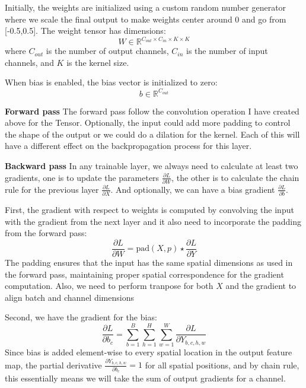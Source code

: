 \documentclass[conference]{IEEEtran}
\begin{document}
Initially, the weights are initialized using a custom random number generator where we scale the final output to make weights center around 0 and go from [-0.5,0.5]. The weight tensor has dimensions:
\begin{equation}
W \in \mathbb{R}^{C_{out} \times C_{in} \times K \times K}
\end{equation}
where $C_{out}$ is the number of output channels, $C_{in}$ is the number of input channels, and $K$ is the kernel size.

When bias is enabled, the bias vector is initialized to zero:
\begin{equation}
b \in \mathbb{R}^{C_{out}}
\end{equation}

\textbf{Forward pass} The forward pass follow the convolution operation I have created above for the Tensor. Optionally, the input could add more padding to control the shape of the output or we could do a dilation for the kernel. Each of this will have a different effect on the backpropagation process for this layer.

\textbf{Backward pass} In any trainable layer, we always need to calculate at least two gradients, one is to update the parameters $\frac{\partial L}{\partial W}$, the other is to calculate the chain rule for the previous layer $\frac{\partial L}{\partial X}$. And optionally, we can have a bias gradient $\frac{\partial L}{\partial b}$.

First, the gradient with respect to weights is computed by convolving the input with the gradient from the next layer and it also need to incorporate the padding from the forward pass:
\begin{equation}
\frac{\partial L}{\partial W} = \text{pad}(X, p) \star \frac{\partial L}{\partial Y}
\end{equation}
The padding ensures that the input has the same spatial dimensions as used in the forward pass, maintaining proper spatial correspondence for the gradient computation. Also, we need to perform tranpose for both $X$ and the gradient to align batch and channel dimensions

Second, we have the gradient for the bias:
\begin{equation}
\frac{\partial L}{\partial b_c} = \sum_{b=1}^{B} \sum_{h=1}^{H} \sum_{w=1}^{W} \frac{\partial L}{\partial Y_{b,c,h,w}}
\end{equation}
Since bias is added element-wise to every spatial location in the output feature map, the partial derivative $\frac{\partial Y_{b,c,h,w}}{\partial b_c} = 1$ for all spatial positions, and by chain rule, this essentially means we will take the sum of output gradients for a channel.
\end{document}
